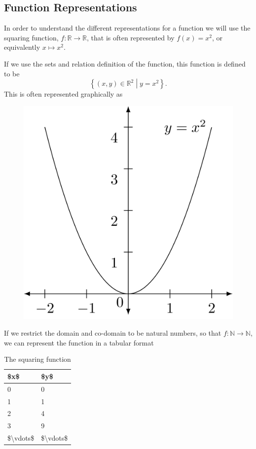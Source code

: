 \documentclass[
]{book}
\theoremstyle{definition}
\theoremstyle{definition}
\theoremstyle{definition}
\theoremstyle{remark}
\begin{document}
\hypertarget{function-representations}{%
\subsection{Function Representations}\label{function-representations}}

In order to understand the different representations for a function we will use the squaring function, \(f:\mathbb{R}\rightarrow \mathbb{R}\), that is often represented by \(f(x)=x^2\), or equivalently \(x\mapsto x^2\).

If we use the sets and relation definition of the function, this function is defined to be
\[\left\{ (x,y)\in \mathbb{R}^2 \middle \vert  y=x^2\right\}.\] This is often represented graphically as

\begin{figure}
 
 {\centering \includegraphics[width=0.4\linewidth]{tikz/graph-y-equals-xsquared} 
 
 }
 
 \end{figure}

If we restrict the domain and co-domain to be natural numbers, so that \(f:\mathbb{N}\rightarrow \mathbb{N}\), we can represent the function in a tabular format

\begin{table}

\caption{\label{tab:squares}The squaring function}
\centering
\begin{tabular}[t]{l|l}
\hline
\$x\$ & \$y\$\\
\hline
0 & 0\\
\hline
1 & 1\\
\hline
2 & 4\\
\hline
3 & 9\\
\hline
\$\textbackslash{}vdots\$ & \$\textbackslash{}vdots\$\\
\hline
\end{tabular}
\end{table}
\end{document}
